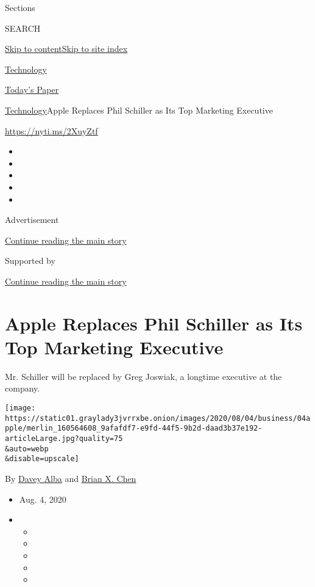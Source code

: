 Sections

SEARCH

\protect\hyperlink{site-content}{Skip to
content}\protect\hyperlink{site-index}{Skip to site index}

\href{https://www.nytimes3xbfgragh.onion/section/technology}{Technology}

\href{https://myaccount.nytimes3xbfgragh.onion/auth/login?response_type=cookie\&client_id=vi}{}

\href{https://www.nytimes3xbfgragh.onion/section/todayspaper}{Today's
Paper}

\href{/section/technology}{Technology}\textbar{}Apple Replaces Phil
Schiller as Its Top Marketing Executive

\url{https://nyti.ms/2XuyZtf}

\begin{itemize}
\item
\item
\item
\item
\item
\end{itemize}

Advertisement

\protect\hyperlink{after-top}{Continue reading the main story}

Supported by

\protect\hyperlink{after-sponsor}{Continue reading the main story}

\hypertarget{apple-replaces-phil-schiller-as-its-top-marketing-executive}{%
\section{Apple Replaces Phil Schiller as Its Top Marketing
Executive}\label{apple-replaces-phil-schiller-as-its-top-marketing-executive}}

Mr. Schiller will be replaced by Greg Joswiak, a longtime executive at
the company.

\texttt{[image: https://static01.graylady3jvrrxbe.onion/images/2020/08/04/business/04apple/merlin\_160564608\_9afafdf7-e9fd-44f5-9b2d-daad3b37e192-articleLarge.jpg?quality=75\\\&auto=webp\\\&disable=upscale]}

By \href{https://www.nytimes3xbfgragh.onion/by/davey-alba}{Davey Alba}
and \href{https://www.nytimes3xbfgragh.onion/by/brian-x-chen}{Brian X.
Chen}

\begin{itemize}
\item
  Aug. 4, 2020
\item
  \begin{itemize}
  \item
  \item
  \item
  \item
  \item
  \end{itemize}
\end{itemize}

